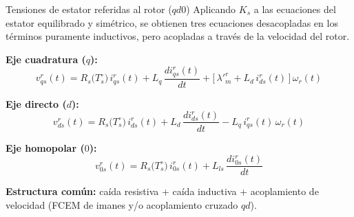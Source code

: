 \documentclass[aspectratio=169,t]{beamer}
\begin{document}
\begin{frame}{Tensiones de estator referidas al rotor ($qd0$)}
{\small\color{uncGray}Aplicando $K_s$ a las ecuaciones del estator equilibrado y simétrico, se obtienen tres ecuaciones desacopladas en los términos puramente inductivos, pero acopladas a través de la velocidad del rotor.}\par
\vspace{3mm}

\textbf{Eje cuadratura ($q$):}
\begin{equation*}
v^{r}_{qs}(t) = R_s\!\big(T_s^\circ\big)\,i^{r}_{qs}(t) + L_q\,\frac{d i^{r}_{qs}(t)}{dt} + \big[\,\lambda'^r_m + L_d\,i^{r}_{ds}(t)\,\big]\,\omega_r(t)
\end{equation*}

\textbf{Eje directo ($d$):}
\begin{equation*}
v^{r}_{ds}(t) = R_s\!\big(T_s^\circ\big)\,i^{r}_{ds}(t) + L_d\,\frac{d i^{r}_{ds}(t)}{dt} - L_q\,i^{r}_{qs}(t)\,\omega_r(t)
\end{equation*}

\textbf{Eje homopolar ($0$):}
\begin{equation*}
v^{r}_{0s}(t) = R_s\!\big(T_s^\circ\big)\,i^{r}_{0s}(t) + L_{ls}\,\frac{d i^{r}_{0s}(t)}{dt}
\end{equation*}

\vspace{1mm}
{\small \textbf{Estructura común:} caída resistiva + caída inductiva + acoplamiento de velocidad (FCEM de imanes y/o acoplamiento cruzado $qd$).}
\end{frame}
\end{document}
